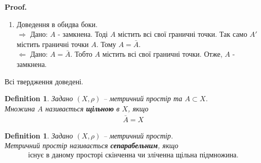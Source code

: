 \documentclass[a4paper, 10pt]{article}
\makeatletter
\def\rightproof{$\boxed{\Rightarrow}$ }
\def\leftproof{$\boxed{\Leftarrow}$ }
\theoremstyle{theoremdd}
\theoremstyle{theoremdd}
\newtheorem{definition}[theorem]{Definition}
\theoremstyle{theoremdd}
\theoremstyle{theoremdd}
\theoremstyle{theoremdd}
\theoremstyle{theoremdd}
\theoremstyle{theoremdd}
\theoremstyle{theoremdd}
\renewenvironment{proof}[1][Proof.\\]{\par
\pushQED{\hfill \qed}%
\normalfont \topsep6\p@\@plus6\p@\relax
\trivlist
\item\relax
{\bfseries
#1\@addpunct{.}}\hspace\labelsep\ignorespaces
}{%
\popQED\endtrivlist\@endpefalse
}
\makeatother
\begin{document}
\begin{proof}
\begin{enumerate}[wide=0pt, label={\arabic*)}]
\item Доведення в обидва боки.\\
\rightproof Дано: $A$ - замкнена. Тоді $A$ містить всі свої граничні точки. Так само $A'$ містить граничні точки $A$. Тому $A = \bar{A}$.\\
\leftproof Дано: $A = \bar{A}$. Тобто $A$ містить всі свої граничні точки. Отже, $A$ - замкнена.
\end{enumerate}
Всі твердження доведені.
\end{proof}

\begin{definition} Задано $(X, \rho)$ -- метричний простір та $A \subset X$.\\
Множина $A$ називається \textbf{щільною} в $X$, якщо
\begin{align*}
\bar{A} = X
\end{align*}
\end{definition}

\begin{definition}
Задано $(X, \rho)$ -- метричний простір.\\
Метричний простір називається \textbf{сепарабельним}, якщо
\begin{align*}
\text{існує в даному просторі скінченна чи зліченна щільна підмножина.}
\end{align*}
\end{definition}
\end{document}
